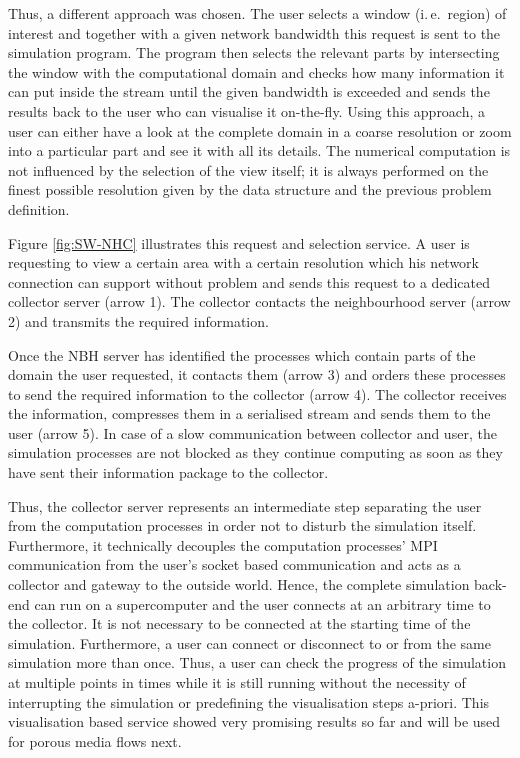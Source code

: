 \documentclass[10pt, conference]{IEEEtran}
\begin{document}
Thus, a different approach was chosen. The user selects a window (i.\,e.\ region) of interest and together with a given network bandwidth this request is sent to the simulation program. The
program then selects the relevant parts by intersecting the window with the computational domain and checks how many information it can put inside the stream until the given bandwidth is
exceeded and sends the results back to the user who can visualise it on-the-fly. Using this approach, a user can either have a look at the complete domain in a coarse resolution or zoom into a
particular part and see it with all its details. The numerical computation is not influenced by the selection of the view itself; it is always performed on the finest possible resolution given by the
data structure and the previous problem definition.

Figure \ref{fig:SW-NHC} illustrates this request and selection service. A user is requesting to view a certain area with a certain resolution which his network connection can support without
problem and sends this request to a dedicated collector server (arrow 1). The collector contacts the neighbourhood server (arrow 2) and transmits the required information.

Once the NBH server has identified the processes which contain parts of the domain the user requested, it contacts them (arrow 3) and orders these processes to send the required information 
to the collector (arrow 4). The collector receives the information, compresses them in a serialised stream and sends them to the user (arrow 5). In case of a slow communication between
collector and user, the simulation processes are not blocked as they continue computing as soon as they have sent their information package to the collector.

Thus, the collector server represents an intermediate step separating the user from the computation processes in order not to disturb the simulation itself. Furthermore, it technically decouples
the computation processes' MPI communication from the user's socket based communication and acts as a collector and gateway to the outside world. Hence, the complete simulation back-end
can run on a supercomputer and the user connects at an arbitrary time to the collector. It is not necessary to be connected at the starting time of the simulation. Furthermore, a user can connect
or disconnect to or from the same simulation more than once. Thus, a user can check the progress of the simulation at multiple points in times while it is still running without the necessity of
interrupting the simulation or predefining the visualisation steps a-priori. This visualisation based service showed very promising results so far and will be used for porous media flows next.
\end{document}
